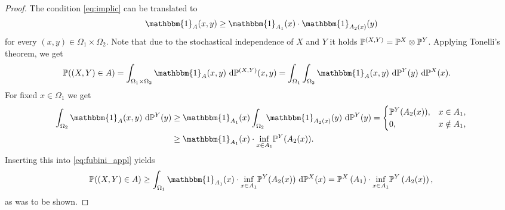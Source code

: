 \begin{proof}
The condition \eqref{eq:implic} can be translated to
\begin{equation*}
\mathbbm{1}_{A}(x,y) \geq \mathbbm{1}_{A_1}(x) \cdot \mathbbm{1}_{A_2(x)}(y)
\end{equation*}
for every $(x,y) \in \Omega_1 \times \Omega_2$. Note that due to the stochastical independence of $X$ and $Y$ it holds $\mathbb{P}^{(X,Y)} = \mathbb{P}^X \otimes \mathbb{P}^Y$. Applying Tonelli's theorem, we get
\begin{align} \label{eq:fubini_appl}
\PP((X,Y) \in A) &= \int_{\Omega_1 \times \Omega_2} \mathbbm{1}_A (x,y) \ \dd \PP^{(X,Y)}(x,y) = \int_{\Omega_1} \int_{\Omega_2} \mathbbm{1}_A(x,y) \ \dd \PP^Y(y) \ \dd \PP^X(x).
\end{align}
For fixed $x \in \Omega_1$ we get
\begin{align*}
\int_{\Omega_2} \mathbbm{1}_A(x,y) \ \dd \PP^Y(y) &\geq \mathbbm{1}_{A_1}(x)\int_{\Omega_2} \mathbbm{1}_{A_2(x)}(y) \ \dd \PP^Y(y) = \begin{cases} \PP^Y (A_2(x)),& x \in A_1, \\0,& x \notin A_1,\end{cases} \\
&\geq \mathbbm{1}_{A_1}(x) \cdot \underset{x \in A_1}{\inf} \PP^Y (A_2(x)).
\end{align*}
Inserting this into \eqref{eq:fubini_appl} yields
\begin{align*}
\PP((X,Y) \in A) \geq \int_{\Omega_1}\mathbbm{1}_{A_1}(x) \cdot \underset{x \in A_1}{\inf} \PP^Y (A_2(x)) \ \dd \PP^X(x) = \PP^{X} \left(A_1\right) \cdot \underset{x \in A_1}{\inf} \PP^{Y} \left(A_2(x)\right),
\end{align*}
as was to be shown.
\end{proof}